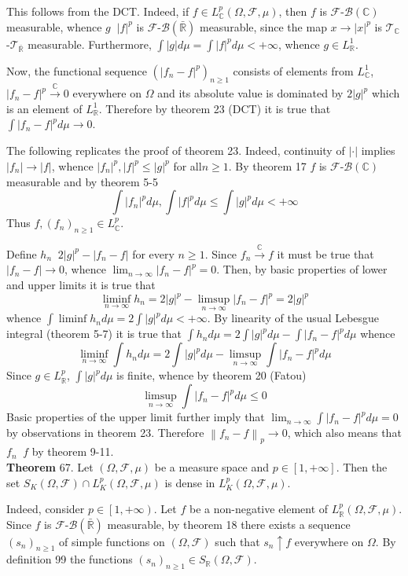 \documentclass[a4paper]{article}
\newcommand{\clo}[1]{\left [ #1 \right ]}
\newcommand{\clop}[1]{\left [ #1 \right )}
\newcommand{\brac}[1]{\left ( #1 \right )}
\newcommand{\abs}[1]{\left | #1 \right |}
\newcommand{\nrm}[1]{\left\| #1 \right \|}
\newcommand{\Rbar}{{\bar{\mathbb{R}}}}
\newcommand{\Real}{\mathbb{R}}
\newcommand{\Cplx}{\mathbb{C}}
\newcommand{\Tcal}{\mathcal{T}}
\newcommand{\Fcal}{\mathcal{F}}
\newcommand{\borel}[1]{\mathcal{B}\brac{#1}}
\newcommand{\defn}{\mathop{\overset{\Delta}{=}}\nolimits}
\newcommand{\lpto}{\mathop{\overset{L^p}{\to}}\nolimits}
\begin{document}
This follows from the DCT. Indeed, if $f\in L^p_\Cplx\brac{\Omega,\Fcal,\mu}$, then $f$ is $\Fcal$-$\borel{\Cplx}$ measurable, whence $g\defn \abs{f}^p$ is $\Fcal$-$\borel{\Rbar}$ measurable, since the map $x\to \abs{x}^p$ is $\Tcal_\Cplx$-$\Tcal_\Rbar$ measurable. Furthermore, $\int \abs{g} d\mu = \int \abs{f}^p d\mu <+\infty$, whence $g\in L^1_\Real$.

Now, the functional sequence $\brac{\abs{f_n-f}^p}_{n\geq1}$ consists of elements from $L^1_\Cplx$, $\abs{f_n-f}^p\overset{\Cplx}{\to}0$ everywhere on $\Omega$ and its absolute value is dominated by $2\abs{g}^p$ which is an element of $L^1_\Real$. Therefore by theorem 23 (DCT) it is true that $\int \abs{f_n-f}^p d\mu \to 0$.

The following replicates the proof of theorem 23. Indeed, continuity of $\abs{\cdot}$ implies $\abs{f_n}\to \abs{f}$, whence $\abs{f_n}^p,\abs{f}^p\leq \abs{g}^p$ for all$n\geq1$. By theorem 17 $f$ is $\Fcal$-$\borel{\Cplx}$ measurable and by theorem 5-5\[\int \abs{f_n}^p d\mu, \int \abs{f}^p d\mu \leq \int \abs{g}^p d\mu < +\infty\] Thus $f,\brac{f_n}_{n\geq1}\in L^p_\Cplx$.

Define $h_n\defn 2\abs{g}^p-\abs{f_n-f}$ for every $n\geq1$. Since $f_n\overset{\Cplx}{\to}f$ it must be true that $\abs{f_n-f}\to 0$, whence $\lim_{n\to\infty}\abs{f_n-f}^p=0$. Then, by basic properties of lower and upper limits it is true that \[\liminf_{n\to \infty} h_n = 2 \abs{g}^p - \limsup_{n\to \infty} \abs{f_n-f}^p = 2\abs{g}^p\] whence $\int \liminf h_n d\mu = 2\int\abs{g}^p d\mu < +\infty$. By linearity of the usual Lebesgue integral (theorem 5-7) it is true that $\int h_n d\mu = 2\int \abs{g}^p d\mu - \int \abs{f_n-f}^p d\mu$ whence \[\liminf_{n\to \infty} \int h_n d\mu = 2\int \abs{g}^p d\mu - \limsup_{n\to \infty} \int \abs{f_n-f}^p d\mu\] Since $g\in L^p_\Real$, $\int \abs{g}^p d\mu$ is finite, whence by theorem 20 (Fatou) \[\limsup_{n\to \infty} \int \abs{f_n-f}^p d\mu \leq 0\] Basic properties of the upper limit further imply that $\lim_{n\to\infty} \int \abs{f_n-f}^p d\mu = 0$ by observations in theorem 23. Therefore $\nrm{f_n-f}_p\to 0$, which also means that $f_n\lpto f$ by theorem 9-11.\\

\label{thm:cplx_simple_dense_lp} \noindent \textbf{Theorem} 67.
Let $\brac{\Omega,\Fcal,\mu}$ be a measure space and $p\in \clo{1, +\infty}$. Then the set $S_K\brac{\Omega, \Fcal}\cap L^p_K\brac{\Omega,\Fcal,\mu}$ is dense in $L^p_K\brac{\Omega,\Fcal,\mu}$.

Indeed, consider $p\in\clop{1,+\infty}$. Let $f$ be a non-negative element of $L^p_\Real\brac{\Omega,\Fcal,\mu}$. Since $f$ is $\Fcal$-$\borel{\Rbar}$ measurable, by theorem 18 there exists a sequence $\brac{s_n}_{n\geq1}$ of simple functions on $\brac{\Omega, \Fcal}$ such that $s_n \uparrow f$ everywhere on $\Omega$. By definition 99 the functions $\brac{s_n}_{n\geq1}\in S_\Real\brac{\Omega, \Fcal}$.
\end{document}
